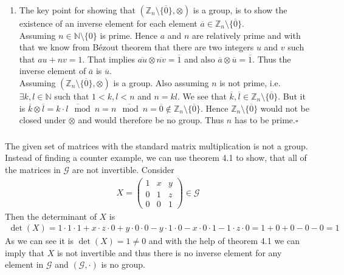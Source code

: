 \documentclass[solution]{tudexercise}
\newcommand{\qed}{\hspace*{\fill}$\square$}
\begin{document}
\begin{enumerate}
				\item
				The key point for showing that $(\mathbb{Z}_n \setminus \{\overline{0}\}, \otimes)$ is a group, is to show the existence of an inverse element for each element $\overline{a} \in \mathbb{Z}_n \setminus \{\overline{0}\}$.\\
				Assuming $n \in \mathbb{N} \setminus \{0\}$ is prime. Hence $a$ and $n$ are relatively prime and with that we know from Bézout theorem that there are two integers $u$ and $v$ such that $au + nv = 1$. That implies $\overline{au} \otimes \overline{nv} = \overline{1}$ and also $\overline{a} \otimes \overline{u} = \overline{1}$. Thus the inverse element of $\overline{a}$ is $\overline{u}$.\\
				Assuming $(\mathbb{Z}_n \setminus \{\overline{0}\}, \otimes)$ is a group. Also assuming $n$ is not prime, i.e. $\exists k, l \in \mathbb{N}$ such that $1 < k, l < n$ and $n = kl$. We see that $\overline{k}, \overline{l} \in \mathbb{Z}_n \setminus \{\overline{0}\}$. But it is $\overline{k} \otimes \overline{l} = \overline{k \cdot l \mod n} = \overline{n \mod n} = \overline{0} \notin \mathbb{Z}_n \setminus \{\overline{0}\}$. Hence $\mathbb{Z}_n \setminus \{\overline{0}\}$ would not be closed under $\otimes$ and would therefore be no group. Thus $n$ has to be prime.\qed
				\end{enumerate}
			
			\subsubsection{}
				The given set of matrices with the standard matrix multiplication is not a group. Instead of finding a counter example, we can use theorem 4.1 to show, that all of the matrices in $\mathcal{G}$ are not invertible. Consider
				\begin{align*}
X = \begin{pmatrix}
1 & x & y\\
0 & 1 & z\\
0 & 0 & 1
\end{pmatrix} \in \mathcal{G}
				\end{align*}
				Then the determinant of $X$ is
				\begin{align*}
\det(X) = 1 \cdot 1 \cdot 1 + x \cdot z \cdot 0 + y \cdot 0 \cdot 0 - y \cdot 1 \cdot 0 - x \cdot 0 \cdot 1 - 1 \cdot z \cdot 0 = 1 + 0 + 0 - 0 - 0 = 1
				\end{align*}
				As we can see it is $\det(X) = 1 \neq 0$ and with the help of theorem 4.1 we can imply that $X$ is not invertible and thus there is no inverse element for any element in $\mathcal{G}$ and $(\mathcal{G}, \cdot)$ is no group.
			
\end{document}
